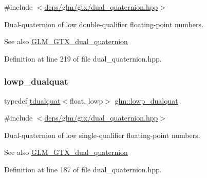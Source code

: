 {\ttfamily \#include $<$\hyperlink{dual__quaternion_8hpp}{deps/glm/gtx/dual\+\_\+quaternion.\+hpp}$>$}

Dual-\/quaternion of low double-\/qualifier floating-\/point numbers.

\begin{DoxySeeAlso}{See also}
\hyperlink{group__gtx__dual__quaternion}{G\+L\+M\+\_\+\+G\+T\+X\+\_\+dual\+\_\+quaternion} 
\end{DoxySeeAlso}


Definition at line 219 of file dual\+\_\+quaternion.\+hpp.

\mbox{\label{group__gtx__dual__quaternion_ga4888200ed911e4887c2423fed74ad362}} 
\subsubsection{\texorpdfstring{lowp\+\_\+dualquat}{lowp\_dualquat}}
{\footnotesize\ttfamily typedef \hyperlink{structglm_1_1tdualquat}{tdualquat}$<$float, lowp$>$ \hyperlink{group__gtx__dual__quaternion_ga4888200ed911e4887c2423fed74ad362}{glm\+::lowp\+\_\+dualquat}}



{\ttfamily \#include $<$\hyperlink{dual__quaternion_8hpp}{deps/glm/gtx/dual\+\_\+quaternion.\+hpp}$>$}

Dual-\/quaternion of low single-\/qualifier floating-\/point numbers.

\begin{DoxySeeAlso}{See also}
\hyperlink{group__gtx__dual__quaternion}{G\+L\+M\+\_\+\+G\+T\+X\+\_\+dual\+\_\+quaternion} 
\end{DoxySeeAlso}


Definition at line 187 of file dual\+\_\+quaternion.\+hpp.

\mbox{\label{group__gtx__dual__quaternion_ga797f6d2679ab6773c1f057b97bf95111}} 
